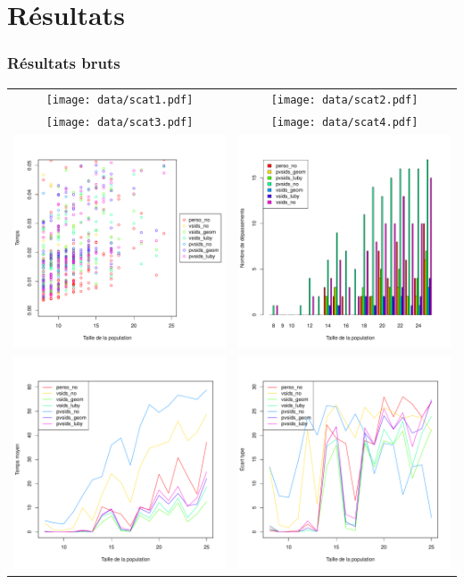 \documentclass{beamer}
\begin{document}
\section{Résultats}
\begin{frame}
    \frametitle{Résultats bruts}
    \begin{center}
        \begin{tabular}{cc}
            \texttt{[image: data/scat1.pdf]} & \texttt{[image: data/scat2.pdf]} \\
            \texttt{[image: data/scat3.pdf]} & \texttt{[image: data/scat4.pdf]} \\
            \includegraphics[width=0.4\linewidth]{data/small.pdf} & \includegraphics[width=0.4\linewidth]{data/over.pdf} \\
            \includegraphics[width=0.4\linewidth]{data/mean.pdf} & \includegraphics[width=0.4\linewidth]{data/sd.pdf} \\
        \end{tabular}
    \end{center}
\end{frame}
\end{document}
